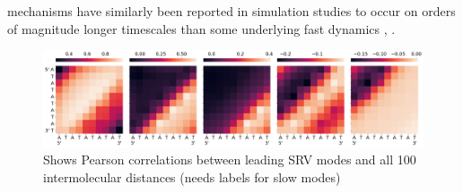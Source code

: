 \documentclass[journal=jpcbfk,manuscript=article]{achemso}
\begin{document}
mechanisms have similarly been reported in simulation studies to occur on orders of magnitude longer timescales than some  underlying fast dynamics \citep{Markegard2015}, \citep{Xiao2019}. 

\begin{figure}[ht!]
	\begin{center}
        \includegraphics[width=\textwidth]{Figs/figs_0804/AT-all_srv_correlations.png}
        \caption{Shows Pearson correlations between leading SRV modes and all 100 intermolecular distances (needs labels for slow modes)}
        \label{fig:AT-all_srv_correlations}
	\end{center}
\end{figure}
\end{document}
